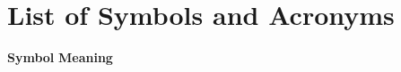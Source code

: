 \renewcommand*{\SectDir}{sections/00-preface}


\newpage

\newpage

\newpage

\listoffigures
\listoftables 

\newpage

\section*{List of Symbols and Acronyms}

\begin{tabbing}
\textbf{Symbol}    \hspace{2cm}\=\textbf{Meaning} \\\\


\end{tabbing}
